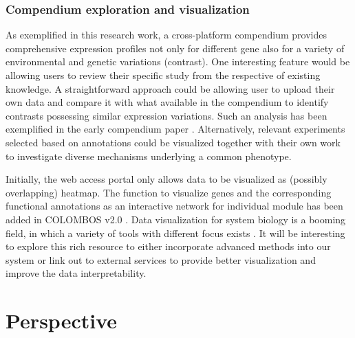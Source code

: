 \subsubsection*{Compendium exploration and visualization}

As exemplified in this research work, a cross-platform compendium provides comprehensive expression profiles not only for different gene also for a variety of environmental and genetic variations (contrast). One interesting feature would be allowing users to review their specific study from the respective of existing knowledge. A straightforward approach could be allowing user to upload their own data and compare it with what available in the compendium to identify contrasts possessing similar expression variations. Such an analysis has been exemplified in the early compendium paper \cite{Hughes2000}. Alternatively, relevant experiments selected based on annotations could be visualized together with their own work to investigate diverse mechanisms underlying a common phenotype. 




Initially, the web access portal only allows data to be visualized as (possibly overlapping) heatmap.  The function to visualize genes and the corresponding functional annotations as an interactive network for individual module has been added in COLOMBOS v2.0 \cite{Meysman2014}. Data visualization for system biology is a booming field, in which a variety of tools with different focus exists \cite{Gehlenborg2010}. It will be interesting to explore this rich resource to either incorporate advanced methods into our system or link out to external services to provide better visualization and improve the data interpretability.
























\section{Perspective}


